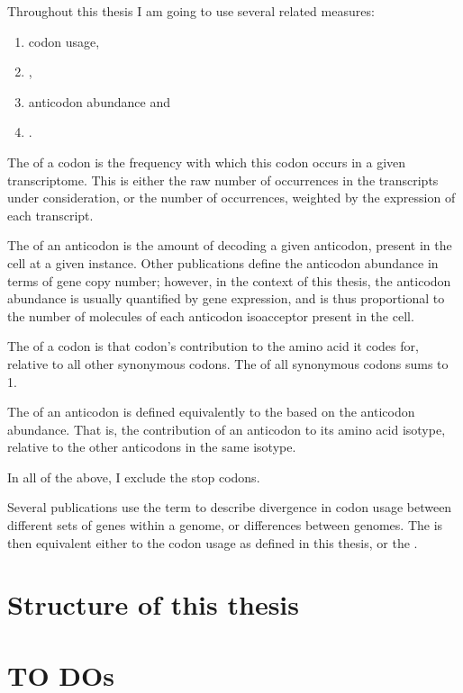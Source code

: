 Throughout this thesis I am going to use several related measures:

\begin{enumerate}
    \item codon usage,
    \item \rcu,
    \item anticodon abundance and
    \item \raa.
\end{enumerate}

The  of a codon is the frequency with which this codon
occurs in a given transcriptome. This is either the raw number of occurrences in
the transcripts under consideration, or the number of occurrences, weighted by
the expression of each transcript.

The  of an anticodon is the amount of \trna
decoding a given anticodon, present in the cell at a given instance. Other
publications define the anticodon abundance in terms of \trna gene copy number;
however, in the context of this thesis, the anticodon abundance is usually
quantified by \trna gene expression, and is thus proportional to the number of
\trna molecules of each anticodon isoacceptor present in the cell.

The  of a codon is that codon’s contribution to the amino acid it
codes for, relative to all other synonymous codons. The \rcu of all synonymous
codons sums to \num{1}.

The  of an anticodon is defined equivalently to the \rcu based on
the anticodon abundance. That is, the contribution of an anticodon to its amino
acid isotype, relative to the other anticodons in the same isotype.

In all of the above, I exclude the stop codons.

Several publications use the term \cub to describe divergence in codon usage
between different sets of genes within a genome, or differences between genomes.
The \cub is then equivalent either to the codon usage as defined in this thesis,
or the \rcu.

\section{Structure of this thesis}

\section{TO DOs}

